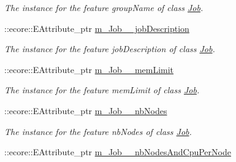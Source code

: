 \begin{DoxyCompactItemize}
\begin{DoxyCompactList}\small\item\em The instance for the feature groupName of class \hyperlink{classTMS__Data_1_1Job}{Job}. \item\end{DoxyCompactList}\item 
\hypertarget{classTMS__Data_1_1TMS__DataPackage_a3f76acd193e848332e285d154b38aeef}{
::ecore::EAttribute\_\-ptr \hyperlink{classTMS__Data_1_1TMS__DataPackage_a3f76acd193e848332e285d154b38aeef}{m\_\-Job\_\-\_\-jobDescription}}
\label{classTMS__Data_1_1TMS__DataPackage_a3f76acd193e848332e285d154b38aeef}

\begin{DoxyCompactList}\small\item\em The instance for the feature jobDescription of class \hyperlink{classTMS__Data_1_1Job}{Job}. \item\end{DoxyCompactList}\item 
\hypertarget{classTMS__Data_1_1TMS__DataPackage_a035e15fde204145d744471b68452bd53}{
::ecore::EAttribute\_\-ptr \hyperlink{classTMS__Data_1_1TMS__DataPackage_a035e15fde204145d744471b68452bd53}{m\_\-Job\_\-\_\-memLimit}}
\label{classTMS__Data_1_1TMS__DataPackage_a035e15fde204145d744471b68452bd53}

\begin{DoxyCompactList}\small\item\em The instance for the feature memLimit of class \hyperlink{classTMS__Data_1_1Job}{Job}. \item\end{DoxyCompactList}\item 
\hypertarget{classTMS__Data_1_1TMS__DataPackage_a3407c79f1cc7d1b0d70c62c13e5343ad}{
::ecore::EAttribute\_\-ptr \hyperlink{classTMS__Data_1_1TMS__DataPackage_a3407c79f1cc7d1b0d70c62c13e5343ad}{m\_\-Job\_\-\_\-nbNodes}}
\label{classTMS__Data_1_1TMS__DataPackage_a3407c79f1cc7d1b0d70c62c13e5343ad}

\begin{DoxyCompactList}\small\item\em The instance for the feature nbNodes of class \hyperlink{classTMS__Data_1_1Job}{Job}. \item\end{DoxyCompactList}\item 
\hypertarget{classTMS__Data_1_1TMS__DataPackage_a4c2268740fa0a9d7709d499739db3186}{
::ecore::EAttribute\_\-ptr \hyperlink{classTMS__Data_1_1TMS__DataPackage_a4c2268740fa0a9d7709d499739db3186}{m\_\-Job\_\-\_\-nbNodesAndCpuPerNode}}
\label{classTMS__Data_1_1TMS__DataPackage_a4c2268740fa0a9d7709d499739db3186}


\end{DoxyCompactItemize}
